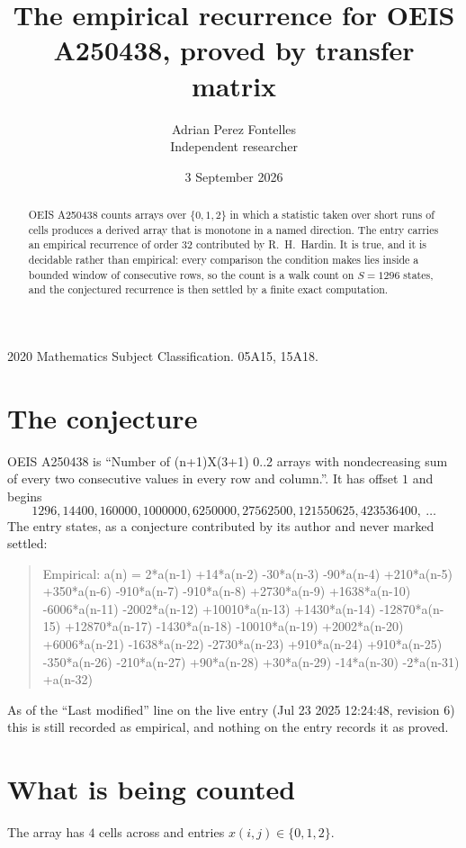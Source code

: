\documentclass[11pt,a4paper]{article}
\title{The empirical recurrence for OEIS A250438, proved by transfer matrix}
\author{Adrian Perez Fontelles\\ \small Independent researcher}
\date{3 September 2026}
\theoremstyle{plain}
\theoremstyle{definition}
\begin{document}
\maketitle

\begin{abstract}
OEIS A250438 counts arrays over $\{0,1,2\}$ in which a statistic taken over short runs
of cells produces a derived array that is monotone in a named direction. The entry carries an
empirical recurrence of order $32$ contributed by R.~H.~Hardin. It is true, and it is
decidable rather than empirical: every comparison the condition makes lies inside a bounded
window of consecutive rows, so the count is a walk count on $S=1296$ states, and the
conjectured recurrence is then settled by a finite exact computation.
\end{abstract}

\noindent\small 2020 Mathematics Subject Classification. 05A15, 15A18.\normalsize

\section{The conjecture}

OEIS A250438 is ``Number of (n+1)X(3+1) 0..2 arrays with nondecreasing sum of every two consecutive values in every row and column.''. It has offset $1$ and begins
\[
1296, 14400, 160000, 1000000, 6250000, 27562500, 121550625, 423536400,\ \dots
\]
The entry states, as a conjecture contributed by its author and never marked settled:
\begin{quote}
Empirical: a(n) = 2*a(n-1) +14*a(n-2) -30*a(n-3) -90*a(n-4) +210*a(n-5) +350*a(n-6) -910*a(n-7) -910*a(n-8) +2730*a(n-9) +1638*a(n-10) -6006*a(n-11) -2002*a(n-12) +10010*a(n-13) +1430*a(n-14) -12870*a(n-15) +12870*a(n-17) -1430*a(n-18) -10010*a(n-19) +2002*a(n-20) +6006*a(n-21) -1638*a(n-22) -2730*a(n-23) +910*a(n-24) +910*a(n-25) -350*a(n-26) -210*a(n-27) +90*a(n-28) +30*a(n-29) -14*a(n-30) -2*a(n-31) +a(n-32)
\end{quote}
As of the ``Last modified'' line on the live entry (Jul 23 2025 12:24:48, revision 6) this is still
recorded as empirical, and nothing on the entry records it as proved.

\section{What is being counted}

The array has $4$ cells across and entries $x(i,j)\in\{0,1,2\}$.
\end{document}
